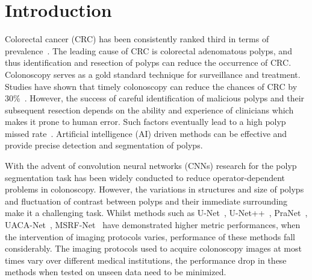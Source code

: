 \documentclass[conference]{IEEEtran}
\begin{document}
\section{Introduction}
\label{sec:intro}
Colorectal cancer (CRC) has been consistently ranked third in terms of prevalence~\cite{howlader2018seer}. The leading cause of CRC is colorectal adenomatous polyps, and thus identification and resection of polyps can reduce the occurrence of CRC. Colonoscopy serves as a gold standard technique for surveillance and treatment. Studies have shown that timely colonoscopy can reduce the chances of CRC by 30\%~\cite{haggar2009colorectal}. However, the success of careful identification of malicious polyps and their subsequent resection depends on the ability and experience of clinicians which makes it prone to human error. Such factors eventually lead to a high polyp missed rate~\cite{puyal2020endoscopic}. Artificial intelligence (AI) driven methods can be effective and provide precise detection and segmentation of polyps. 

With the advent of convolution neural networks (CNNs) research for the polyp segmentation task has been widely conducted to reduce operator-dependent problems in colonoscopy. However, the variations in structures and size of polyps and fluctuation of contrast between polyps and their immediate surrounding make it a challenging task. Whilst methods such as U-Net~\cite{ronneberger2015u}, U-Net++~\cite{zhou2019unet++}, PraNet~\cite{fan2020pranet}, UACA-Net~\cite{kim2021uacanet}, MSRF-Net~\cite{srivastava2021msrf} have demonstrated higher metric performances, when the intervention of imaging protocols varies, performance of these methods fall considerably. The imaging protocols used to acquire colonoscopy images at most times vary over different medical institutions, the performance drop in these methods when tested on unseen data need to be minimized. 
\end{document}
